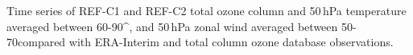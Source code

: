 \label{fig:time_series}
Time series of REF-C1 and REF-C2 total ozone column and 50\,hPa temperature averaged between 60-90{^\circ}, and 50\,hPa zonal wind averaged between 50-70\degrees compared with ERA-Interim and total column ozone database observations.